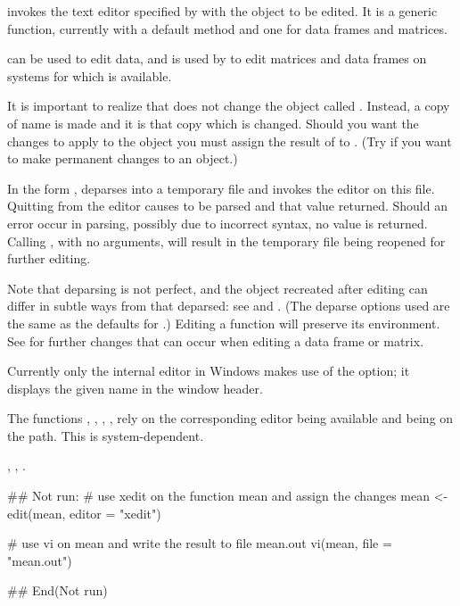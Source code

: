 %
\begin{Details}\relax
{} invokes the text editor specified by  with
the object  to be edited.  It is a generic function,
currently with a default method and one for data frames and matrices.

 can be used to edit data, and is used by 
to edit matrices and data frames on systems for which
 is available.

It is important to realize that  does not change the object
called . Instead, a copy of name is made and it is that
copy which is changed.  Should you want the changes to apply to the
object  you must assign the result of  to
.  (Try  if you want to make permanent
changes to an object.)

In the form ,
 deparses  into a temporary file and invokes the
editor  on this file. Quitting from the editor causes
 to be parsed and that value returned.
Should an error occur in parsing, possibly due to incorrect syntax, no
value is returned. Calling , with no arguments, will
result in the temporary file being reopened for further editing.

Note that deparsing is not perfect, and the object recreated after
editing can differ in subtle ways from that deparsed: see
 and . (The deparse options
used are the same as the defaults for .)  Editing a
function will preserve its environment.  See
 for further changes that can occur when
editing a data frame or matrix.

Currently only the internal editor in Windows makes use of the 
 option; it displays the given name in the window 
header.
\end{Details}
%
\begin{Note}\relax
The functions , , , ,
 rely on the corresponding editor being available and
being on the path. This is system-dependent.
\end{Note}
%
\begin{SeeAlso}\relax
{},
,
.
\end{SeeAlso}
%
\begin{Examples}
\begin{ExampleCode}
## Not run: 
# use xedit on the function mean and assign the changes
mean <- edit(mean, editor = "xedit")

# use vi on mean and write the result to file mean.out
vi(mean, file = "mean.out")

## End(Not run)
\end{ExampleCode}
\end{Examples}
